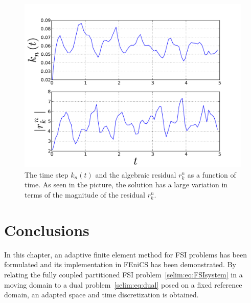 \begin{figure}
\label{selim:fig:cavity_timestep}
\caption{The time step $k_n(t)$ and the algebraic residual $r_k^n$ as
  a function of time. As seen in the picture, the solution has a large
  variation in terms of the magnitude of the residual $r_k^n$.}
\includegraphics[width=1.0\textwidth]{chapters/selim/pdf/plot.pdf}
\end{figure}

\section{Conclusions}
In this chapter, an adaptive finite element method for FSI problems
has been formulated and its implementation in FEniCS has been
demonstrated. By relating the fully coupled partitioned FSI
problem~\eqref{selim:eq:FSIsystem} in a moving domain to a dual
problem~\eqref{selim:eq:dual} posed on a fixed reference domain, an
adapted space and time discretization is obtained.




